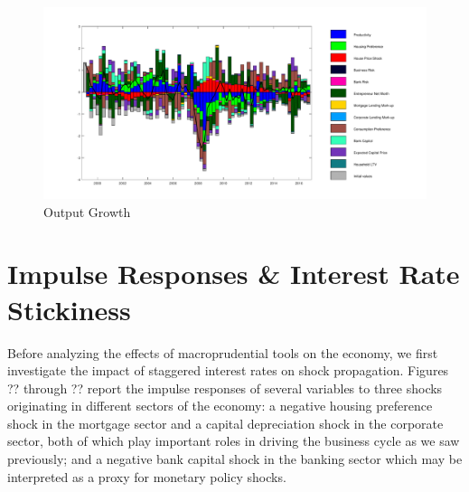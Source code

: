\documentclass[12pt]{article}
\numberwithin{equation}{section}
\begin{document}







\begin{figure}[H]
\centering
\caption{Output Growth}
\label{decomp_dy}
\includegraphics[scale=0.45]{decomp_dy.pdf}
\end{figure}




\section*{Impulse Responses \& Interest Rate Stickiness}

Before analyzing the effects of macroprudential tools on the economy, we first investigate the impact of staggered interest rates on shock propagation. Figures ?? through ?? report the impulse responses of several variables to three shocks originating in different sectors of the economy: a negative housing preference shock in the mortgage sector and a capital depreciation shock in the corporate sector, both of which play important roles in driving the business cycle as we saw previously; and a negative bank capital shock in the banking sector which may be interpreted as a proxy for monetary policy shocks. 
\end{document}
